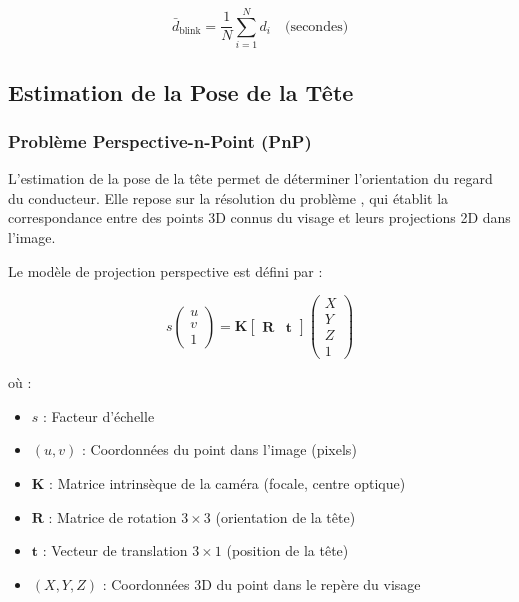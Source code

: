\begin{equation}
\bar{d}_{\text{blink}} = \frac{1}{N} \sum_{i=1}^{N} d_i \quad \text{(secondes)}
\label{eq:blink_duration}
\end{equation}

\subsection{Estimation de la Pose de la Tête}

\subsubsection{Problème Perspective-n-Point (PnP)}

L'estimation de la pose de la tête permet de déterminer l'orientation du regard du conducteur. Elle repose sur la résolution du problème  \cite{lepetit2009}, qui établit la correspondance entre des points 3D connus du visage et leurs projections 2D dans l'image.

Le modèle de projection perspective est défini par :

\begin{equation}
\boxed{
s \begin{pmatrix} u \\ v \\ 1 \end{pmatrix} = \mathbf{K} \begin{bmatrix} \mathbf{R} & \mathbf{t} \end{bmatrix} \begin{pmatrix} X \\ Y \\ Z \\ 1 \end{pmatrix}
}
\label{eq:pnp}
\end{equation}

où :
\begin{itemize}
    \item $s$ : Facteur d'échelle
    \item $(u, v)$ : Coordonnées du point dans l'image (pixels)
    \item $\mathbf{K}$ : Matrice intrinsèque de la caméra (focale, centre optique)
    \item $\mathbf{R}$ : Matrice de rotation $3 \times 3$ (orientation de la tête)
    \item $\mathbf{t}$ : Vecteur de translation $3 \times 1$ (position de la tête)
    \item $(X, Y, Z)$ : Coordonnées 3D du point dans le repère du visage
\end{itemize}


